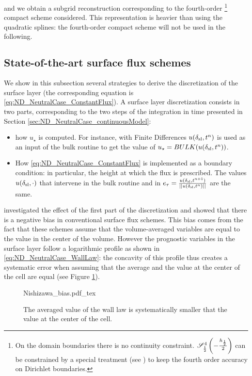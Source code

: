 and we obtain a subgrid reconstruction corresponding to
the fourth-order
\footnote{
On the domain boundaries there is no continuity constraint.
${\cal S}^4_{\frac{1}{2}}\left(-\frac{h_{\frac{1}{2}}}{2}\right)$
can be constrained by a special treatment
(see \cite{piller_finite-volume_2004})
to keep the fourth order accuracy on Dirichlet boundaries.
}
compact scheme considered.
This representation is heavier than using the quadratic splines:
the fourth-order compact scheme will not be used in the
following.


\subsection{State-of-the-art surface flux schemes}
\label{sec:ND_NeutralCase_strategies}
We show in this subsection several strategies to derive the
discretization of the surface layer (the corresponding equation
is \eqref{eq:ND_NeutralCase_ConstantFlux}).
A surface layer discretization consists in two parts,
corresponding to the two steps of the integration in time
presented in Section \ref{sec:ND_NeutralCase_continuousModel}:
\begin{itemize}
	\item how $u_\star$ is computed.
		For instance, with Finite Differences
		$u(\delta_{\rm sl}, t^n)$ is 
		used as an input of the
		bulk routine to get the value of
		$u_\star = BULK(u(\delta_{\rm sl}, t^n))$.
	\item How \eqref{eq:ND_NeutralCase_ConstantFlux}
		is implemented as
		a boundary condition: in particular,
		the height at which the flux is prescribed.
		The values $u(\delta_{\rm sl}, \cdot)$ that intervene
		in the bulk routine and in
		$e_\tau= \frac{u(\delta_{\rm sl},
		t^{n+1})}
		{||u(\delta_{\rm sl}, t^n)||}$
		are the same.
\end{itemize}
\cite{nishizawa_surface_2018} investigated the effect of the
first part of the discretization and showed that there is a
negative bias in conventional surface flux schemes. This
bias comes from the fact that these schemes assume that the
volume-averaged variables are equal to the value in the center
of the volume. However the prognostic variables in the surface layer
follow a logarithmic profile as shown in
\eqref{eq:ND_NeutralCase_WallLaw}: the concavity of this profile thus
creates a systematic error when assuming that the average and the
value at the center of the cell are equal
(see Figure \ref{fig:ND_NeutralCase_nishizawaBias}).
\begin{figure}
	\centering
	{Nishizawa_bias.pdf_tex}
	\caption{The averaged value of the wall law is
		systematically smaller that the value at
		the center of the cell.}
	\label{fig:ND_NeutralCase_nishizawaBias}
\end{figure}
